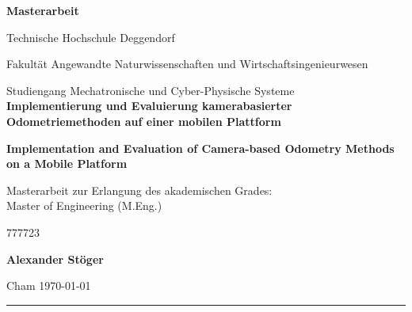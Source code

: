 \begin{titlepage}
    \centering

      \Large
      \vspace{5cm}
   
      \textbf{Masterarbeit}
    
		\linespread{2}   
		   
      	\normalsize Technische Hochschule Deggendorf\\ 
      	\linespread{2}
      	
      	\normalsize Fakult\"at Angewandte Naturwissenschaften und Wirtschaftsingenieurwesen\\
      	\linespread{2}
      	
      	\normalsize Studiengang Mechatronische und Cyber-Physische Systeme\\
      	
	      
	  	\Large
	  	\vspace{0.5cm}
	  \textbf{Implementierung und Evaluierung kamerabasierter Odometriemethoden auf einer mobilen Plattform}
	  \vspace{0.5cm}
	  
	  
	  \textbf{Implementation and Evaluation of Camera-based Odometry Methods on a Mobile Platform}
	  \vspace{1cm}
  
      \normalsize Masterarbeit zur Erlangung des akademischen Grades:\\
      \normalsize Master of Engineering (M.Eng.)
      
      \vspace{1.0cm}
        {777723}{}

                              \textbf{Alexander St\"oger }

      \vspace{\fill}
      
      \normalsize Cham \today
      
      \rule{\textwidth}{.5pt}
      
\end{titlepage}